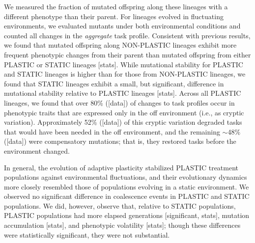 We measured the fraction of mutated offspring along these lineages with a different phenotype than their parent.
For lineages evolved in fluctuating environments, we evaluated mutants under both environmental conditions and counted all changes in the \textit{aggregate} task profile.
Consistent with previous results, we found that mutated offspring along NON-PLASTIC lineages exhibit more frequent phenotypic changes from their parent than mutated offspring from either PLASTIC or STATIC lineages [stats].
While mutational stability for PLASTIC and STATIC lineages is higher than for those from NON-PLASTIC lineages, we found that STATIC lineages exhibit a small, but significant, difference in mutational stability relative to PLASTIC lineages [stats]. 
Across all PLASTIC lineages, we found that over 80\% ([data]) of changes to task profiles occur in phenotypic traits that are expressed only in the off environment (i.e., as cryptic variation).
Approximately 52\% ([data]) of this cryptic variation degraded tasks that would have been needed in the off environment, and the remaining $\sim$48\% ([data]) were compensatory mutations; that is, they restored tasks before the environment changed.

In general, the evolution of adaptive plasticity stabilized PLASTIC treatment populations against environmental fluctuations, and their evolutionary dynamics more closely resembled those of populations evolving in a static environment.
We observed no significant difference in coalescence events in PLASTIC and STATIC populations.
We did, however, observe that, relative to STATIC populations, PLASTIC populations had more elapsed generations [significant, stats], mutation accumulation [stats], and phenotypic volatility [stats]; though these differences were statistically significant, they were not substantial.

